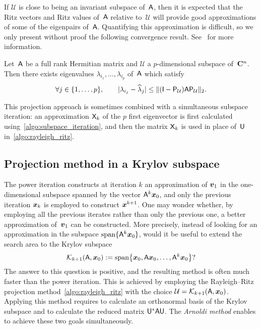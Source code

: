 If $\mathcal U$ is close to being an invariant subspace of~$\mathsf A$,
then it is expected that the Ritz vectors and Ritz values of~$\mathsf A$ relative to~$\mathcal U$ will provide good approximations of some of the eigenpairs of~$\mathsf A$.
Quantifying this approximation is difficult,
so we only present without proof the following convergence result.
See~\cite{MR1990645} for more information.
\begin{proposition}
    Let~$\mathsf A$ be a full rank Hermitian matrix and $\mathcal U$ a $p$-dimensional subspace of~$\mathbf C^n$.
    Then there exists eigenvalues $\lambda_{i_1}, \dotsc, \lambda_{i_p}$ of~$\mathsf A$ which satisfy
    \[
        \forall j \in \{1, \dotsc, p\}, \qquad
        \lvert\lambda_{i_j} - \widehat \lambda_j\rvert \leq \lVert(\mathsf I - \mathsf P_{\mathcal U}) \mathsf A \mathsf P_{\mathcal U}\rVert_2.
    \]
\end{proposition}

This projection approach is sometimes combined with a simultaneous subspace iteration:
an approximation $\mathsf X_k$ of the $p$ first eigenvector is first calculated using~\cref{algo:subspace_iteration},
and then the matrix $\mathsf X_k$ is used in place of~$\mathsf U$ in~\cref{algo:rayleigh_ritz}.


\subsection{Projection method in a Krylov subspace}
The power iteration constructs at iteration $k$ an approximation of $\mathbf{\boldsymbol{v}}_1$ in the one-dimensional subspace spanned by the vector $\mathsf A^k \mathbf{\boldsymbol{x}}_0$,
and only the previous iteration $\mathbf{\boldsymbol{x}}_{k}$ is employed to construct $\mathbf{\boldsymbol{x}}^{k+1}$.
One may wonder whether,
by employing all the previous iterates rather than only the previous one,
a better approximation of~$\mathbf{\boldsymbol{v}}_1$ can be constructed.
More precisely, instead of looking for an approximation in the subspace $\operatorname{span} \{\mathsf A^k \mathbf{\boldsymbol{x}}_0\}$,
would it be useful to extend the search area to the Krylov subspace
\[
    \mathcal K_{k+1}(\mathsf A, \mathbf{\boldsymbol{x}}_0) := \operatorname{span} \bigl\{ \mathbf{\boldsymbol{x}}_0, \mathsf A \mathbf{\boldsymbol{x}}_0, \dotsc, \mathsf A^k \mathbf{\boldsymbol{x}}_0 \bigr\}?
\]
The answer to this question is positive,
and the resulting method is often much faster than the power iteration.
This is achieved by employing the Rayleigh--Ritz projection method~\cref{algo:rayleigh_ritz} with the choice $\mathcal U = \mathcal K_{k+1}(\mathsf A, \mathbf{\boldsymbol{x}}_0)$.
Applying this method requires to calculate an orthonormal basis of the Krylov subspace and to calculate the reduced matrix $\mathsf U^* \mathsf A \mathsf U$.
The \emph{Arnoldi method} enables to achieve these two goals simultaneously.

